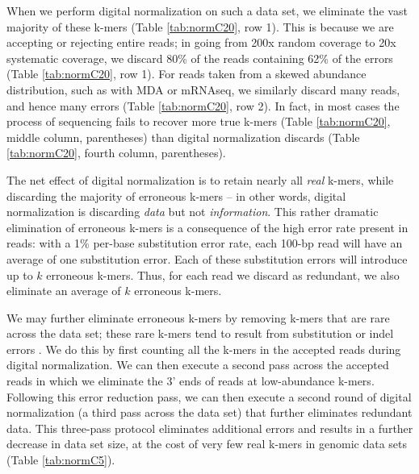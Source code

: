 \documentclass{pnastwo}
\begin{document}
\begin{article}
When we perform digital normalization on such a data set, we eliminate
the vast majority of these k-mers (Table \ref{tab:normC20}, row 1).
This is because we are accepting or rejecting entire reads; in
going from 200x random coverage to 20x systematic coverage, we
discard 80\% of the reads containing 62\% of the errors (Table
\ref{tab:normC20}, row 1).  For reads taken from a skewed abundance
distribution, such as with MDA or mRNAseq, we similarly discard many
reads, and hence many errors (Table \ref{tab:normC20}, row 2).  In
fact, in most cases the process of sequencing fails to recover
more true k-mers (Table \ref{tab:normC20}, middle column, parentheses) than
digital
normalization discards (Table \ref{tab:normC20}, fourth column, parentheses).

The net effect of digital normalization is to retain nearly all {\em
  real} k-mers, while discarding the majority of erroneous k-mers --
in other words, digital normalization is discarding {\em data} but not
{\em information}.  This rather dramatic elimination of erroneous
k-mers is a consequence of the high error rate present in reads: with
a 1\% per-base substitution error rate, each 100-bp read will have an
average of one substitution error. Each of these substitution errors
will introduce up to $k$ erroneous k-mers.  Thus, for each read we
discard as redundant, we also eliminate an average of $k$ erroneous
k-mers.

We may further eliminate erroneous k-mers by removing k-mers that are
rare across the data set; these rare k-mers tend to result from
substitution or indel errors \cite{pubmed21114842}.  We do this by
first counting all the k-mers in the accepted reads during digital
normalization.  We can then execute a second pass across the accepted
reads in which we eliminate the 3' ends of reads at low-abundance
k-mers.  Following this error reduction pass, we can then execute a
second round of digital normalization (a third pass across the data
set) that further eliminates redundant data.  This three-pass protocol
eliminates additional errors and results in a further decrease in data
set size, at the cost of very few real k-mers in genomic data sets
(Table \ref{tab:normC5}).



\end{article}
\end{document}
